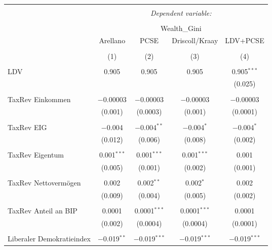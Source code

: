 
\begin{table}[!htbp] \centering 
  \caption{} 
  \label{} 
\begin{tabular}{@{\extracolsep{5pt}}lcccc} 
\\[-1.8ex]\hline 
\hline \\[-1.8ex] 
 & \multicolumn{4}{c}{\textit{Dependent variable:}} \\ 
\cline{2-5} 
\\[-1.8ex] & \multicolumn{4}{c}{Wealth\_Gini} \\ 
 & Arellano & PCSE & Driscoll/Kraay & LDV+PCSE \\ 
\\[-1.8ex] & (1) & (2) & (3) & (4)\\ 
\hline \\[-1.8ex] 
 LDV & 0.905 & 0.905 & 0.905 & 0.905$^{***}$ \\ 
  &  &  &  & (0.025) \\ 
  & & & & \\ 
 TaxRev Einkommen & $-$0.00003 & $-$0.00003 & $-$0.00003 & $-$0.00003 \\ 
  & (0.001) & (0.0003) & (0.001) & (0.0001) \\ 
  & & & & \\ 
 TaxRev EIG & $-$0.004 & $-$0.004$^{**}$ & $-$0.004$^{*}$ & $-$0.004$^{*}$ \\ 
  & (0.012) & (0.006) & (0.008) & (0.002) \\ 
  & & & & \\ 
 TaxRev Eigentum & 0.001$^{***}$ & 0.001$^{***}$ & 0.001$^{***}$ & 0.001 \\ 
  & (0.005) & (0.001) & (0.002) & (0.001) \\ 
  & & & & \\ 
 TaxRev Nettovermögen & 0.002 & 0.002$^{**}$ & 0.002$^{*}$ & 0.002 \\ 
  & (0.009) & (0.004) & (0.005) & (0.002) \\ 
  & & & & \\ 
 TaxRev Anteil an BIP & 0.0001 & 0.0001$^{***}$ & 0.0001$^{***}$ & 0.0001 \\ 
  & (0.002) & (0.0004) & (0.0004) & (0.0001) \\ 
  & & & & \\ 
 Liberaler Demokratieindex & $-$0.019$^{**}$ & $-$0.019$^{***}$ & $-$0.019$^{***}$ & $-$0.019$^{***}$ \\ 

\end{tabular}
\end{table}
